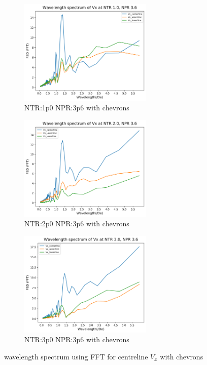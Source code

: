 \begin{figure}[H]
\begin{subfigure}{.5\textwidth}
	\centering
	\includegraphics[width=2.5in]{images/Fft_Vx_NTR1p0_NPR3p6c.png}
	\caption{NTR:1p0 NPR:3p6 with chevrons }
	\label{fig:fftplotsc1p03p6}
\end{subfigure}%
\begin{subfigure}{.5\textwidth}
	\centering
	\includegraphics[width=2.5in]{images/Fft_Vx_NTR2p0_NPR3p6c.png}
	\caption{NTR:2p0 NPR:3p6 with chevrons}
	\label{fig:fftplotsc2p03p6}
\end{subfigure}
\begin{subfigure}{1.0\textwidth}
	\centering
	\includegraphics[width=2.5in]{images/Fft_Vx_NTR3p0_NPR3p6c.png}
	\caption{NTR:3p0 NPR:3p6 with chevrons}
	\label{fig:fftplotsc3p03p6}
\end{subfigure}%
\caption{wavelength spectrum using FFT for centreline $V_x$ with  chevrons }
\label{fig:fftplotsc}
\end{figure}

